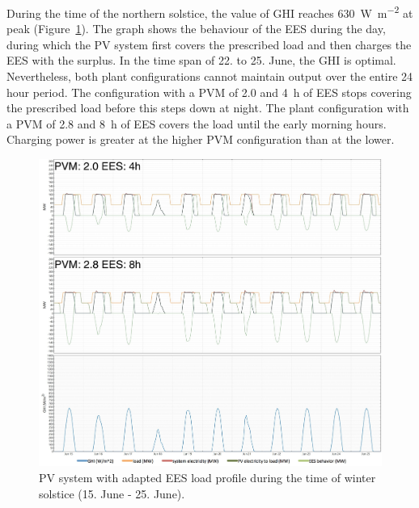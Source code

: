 During the time of the northern solstice, the value of \ac{GHI} reaches \SI{630}{\watt\per\square\metre} at peak (Figure~\ref{PV_winter_load}). The graph shows the behaviour of the \ac{EES} during the day, during which the \ac{PV} system first covers the prescribed load and then charges the \ac{EES} with the surplus. In the time span of 22. to 25. June, the \ac{GHI} is optimal. Nevertheless, both plant configurations cannot maintain output over the entire 24 hour period. The configuration with a \ac{PVM} of \num{2.0} and \SI{4}{h} of \ac{EES} stops covering the prescribed load before this steps down at night. The plant configuration with a \ac{PVM} of \num{2.8} and \SI{8}{h} of \ac{EES} covers the load until the early morning hours. Charging power is greater at the higher \ac{PVM} configuration than at the lower.

\begin{figure}[!bhtp]  
\centering
\includegraphics[width=1\linewidth]{FIG/PV_winter_load}
\caption[PV system with adapted EES load profile during the time of winter solstice.]{PV system with adapted EES load profile during the time of winter solstice (15. June - 25. June).}\label{PV_winter_load}
\end{figure}

